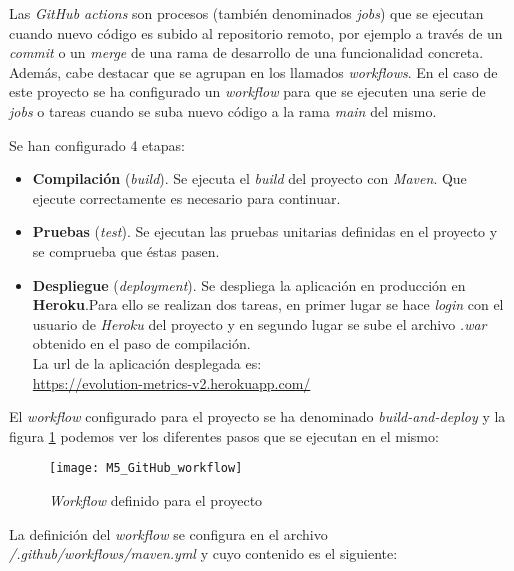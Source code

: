 Las \textit{GitHub actions} son procesos (también denominados \textit{jobs}) que se ejecutan cuando nuevo código es subido al repositorio remoto, por ejemplo a través de un \textit{commit} o un \textit{merge} de una rama de desarrollo de una funcionalidad concreta. Además, cabe destacar que se agrupan en los llamados \textit{workflows}.
En el caso de este proyecto se ha configurado un \textit{workflow} para que se ejecuten una serie de \textit{jobs} o tareas cuando se suba nuevo código a la rama \textit{main} del mismo.

Se han configurado 4 etapas:
\begin{itemize}
	\item \textbf{Compilación} (\textit{build}). Se ejecuta el \textit{build} del proyecto con \textit{Maven}. Que  ejecute correctamente es necesario para continuar.
	\item \textbf{Pruebas} (\textit{test}). Se ejecutan las pruebas unitarias definidas en el proyecto y se comprueba que éstas pasen.
	\item \textbf{Despliegue} (\textit{deployment}). Se despliega la aplicación en producción en \textbf{Heroku}.Para ello se realizan dos tareas, en primer lugar se hace \textit{login} con el usuario de \textit{Heroku} del proyecto y en segundo lugar se sube el archivo \textit{.war} obtenido en el paso de compilación.\\
	
	 La url de la aplicación desplegada es:\\
	\url{https://evolution-metrics-v2.herokuapp.com/}
\end{itemize}

El \textit{workflow} configurado para el proyecto se ha denominado \textit{build-and-deploy} y la figura \ref{fig:M5_GitHub_workflow} podemos ver los diferentes pasos que se ejecutan en el mismo:

\begin{figure}[!h]
	\centering
	\texttt{[image: M5\_GitHub\_workflow]}
	\caption{\textit{Workflow} definido para el proyecto}\label{fig:M5_GitHub_workflow}
\end{figure}
\FloatBarrier

La definición del \textit{workflow} se configura en el archivo \textit{/.github/workflows/maven.yml} y cuyo contenido es el siguiente:\\

